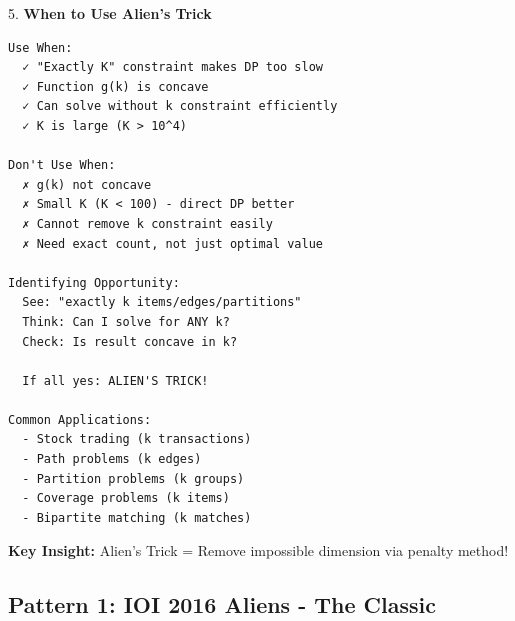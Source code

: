 \documentclass[11pt,a4paper,oneside]{book}
\begin{document}
\begin{tcolorbox}[
    enhanced,breakable,
    colback=white,
    colframe=deepblue,
    boxrule=1.5pt,
    arc=3mm,
    title=\textbf{The Ultimate DP Optimization}
]
5. \textbf{When to Use Alien's Trick}
\begin{verbatim}
Use When:
  ✓ "Exactly K" constraint makes DP too slow
  ✓ Function g(k) is concave
  ✓ Can solve without k constraint efficiently
  ✓ K is large (K > 10^4)

Don't Use When:
  ✗ g(k) not concave
  ✗ Small K (K < 100) - direct DP better
  ✗ Cannot remove k constraint easily
  ✗ Need exact count, not just optimal value

Identifying Opportunity:
  See: "exactly k items/edges/partitions"
  Think: Can I solve for ANY k?
  Check: Is result concave in k?
  
  If all yes: ALIEN'S TRICK!

Common Applications:
  - Stock trading (k transactions)
  - Path problems (k edges)
  - Partition problems (k groups)
  - Coverage problems (k items)
  - Bipartite matching (k matches)
\end{verbatim}

\textbf{Key Insight:}
Alien's Trick = Remove impossible dimension via penalty method!
\end{tcolorbox}

\subsection{Pattern 1: IOI 2016 Aliens - The Classic}
\end{document}
